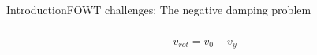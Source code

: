 \begin{frame}{Introduction}{FOWT challenges: The negative damping problem}
\begin{columns}
\begin{column}{.4\linewidth}
\begin{figure}[ht]
				\label{fig:turbine_foreaft}
			\end{figure}
			\begin{equation*}\label{eq:vrot}
				v_{rot} = v_0 - v_y
			\end{equation*}
		\end{column}
	\end{columns}
	
\end{frame}


%	
%	
%	



%



